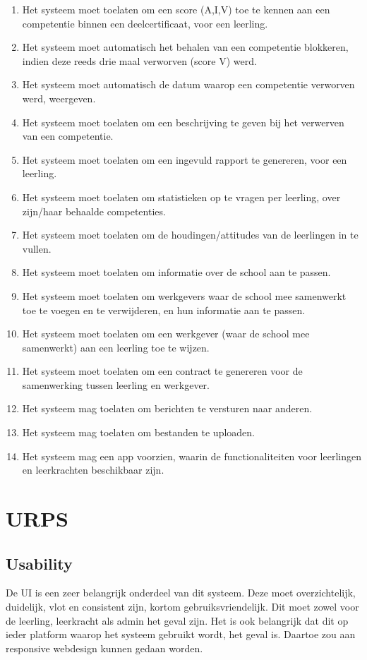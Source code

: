 \documentclass[a4paper]{article}
\begin{document}
\begin{enumerate}
\item Het systeem moet toelaten om een score (A,I,V) toe te kennen aan een competentie binnen een deelcertificaat, voor een leerling.  %
\item Het systeem moet automatisch het behalen van een competentie blokkeren, indien deze reeds drie maal verworven (score V) werd.  %
\item Het systeem moet automatisch de datum waarop een competentie verworven werd, weergeven.
\item Het systeem moet toelaten om een beschrijving te geven bij het verwerven van een competentie.
\item Het systeem moet toelaten om een ingevuld rapport te genereren, voor een leerling.
\item Het systeem moet toelaten om statistieken op te vragen per leerling, over zijn/haar behaalde competenties.
\item Het systeem moet toelaten om de houdingen/attitudes van de leerlingen in te vullen.
\item Het systeem moet toelaten om informatie over de school aan te passen.
\item Het systeem moet toelaten om werkgevers waar de school mee samenwerkt toe te voegen en te verwijderen, en hun informatie aan te passen.
\item Het systeem moet toelaten om een werkgever (waar de school mee samenwerkt) aan een leerling toe te wijzen.
\item Het systeem moet toelaten om een contract te genereren voor de samenwerking tussen leerling en werkgever.
\item Het systeem mag toelaten om berichten te versturen naar anderen.  %
\item Het systeem mag toelaten om bestanden te uploaden.  %
\item Het systeem mag een app voorzien, waarin de functionaliteiten voor leerlingen en leerkrachten beschikbaar zijn.\\  %
\end{enumerate}


\section{URPS} 
\subsection{Usability}
De UI is een zeer belangrijk onderdeel van dit systeem. Deze moet overzichtelijk, duidelijk, vlot en consistent zijn, kortom gebruiksvriendelijk. Dit moet zowel voor de leerling, leerkracht als admin het geval zijn. Het is ook belangrijk dat dit op ieder platform waarop het systeem gebruikt wordt, het geval is. Daartoe zou aan responsive webdesign kunnen gedaan worden.
\end{document}

